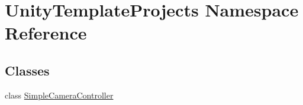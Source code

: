 \hypertarget{namespace_unity_template_projects}{}\section{Unity\+Template\+Projects Namespace Reference}
\label{namespace_unity_template_projects}
\subsection*{Classes}
\begin{DoxyCompactItemize}
\item 
class \hyperlink{class_unity_template_projects_1_1_simple_camera_controller}{Simple\+Camera\+Controller}
\end{DoxyCompactItemize}
